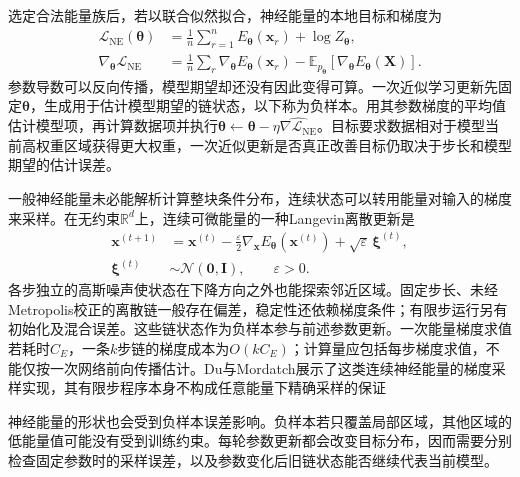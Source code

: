 选定合法能量族后，若以联合似然拟合，神经能量的本地目标和梯度为
\begin{equation}
  \begin{aligned}
    \mathcal{L}_{\mathrm{NE}}(\bm{\theta})
      &=\frac1n\sum_{r=1}^n E_{\bm{\theta}}(\bm{x}_r)
                      +\log Z_{\bm{\theta}},\\
    \nabla_{\bm{\theta}}\mathcal{L}_{\mathrm{NE}}
      &=\frac1n\sum_r\nabla_{\bm{\theta}}E_{\bm{\theta}}(\bm{x}_r)
        -\mathbb{E}_{p_{\bm{\theta}}}
               [\nabla_{\bm{\theta}}E_{\bm{\theta}}(\bm{X})].
  \end{aligned}
  \label{eq:pgm-energy-models-neural-nll}
\end{equation}
参数导数可以反向传播，模型期望却还没有因此变得可算。一次近似学习更新先固定$\bm{\theta}$，生成用于估计模型期望的链状态，以下称为负样本。用其参数梯度的平均值估计模型项，再计算数据项并执行$\bm{\theta}\leftarrow\bm{\theta}-\eta\widehat{\nabla\mathcal{L}_{\mathrm{NE}}}$。目标要求数据相对于模型当前高权重区域获得更大权重，一次近似更新是否真正改善目标仍取决于步长和模型期望的估计误差。

一般神经能量未必能解析计算整块条件分布，连续状态可以转用能量对输入的梯度来采样。在无约束$\mathbb{R}^d$上，连续可微能量的一种Langevin离散更新是
\begin{equation}
  \begin{aligned}
    \bm{x}^{(t+1)}
      &=\bm{x}^{(t)}
        -\frac{\varepsilon}{2}
          \nabla_{\bm{x}}E_{\bm{\theta}}(\bm{x}^{(t)})
        +\sqrt{\varepsilon}\,\bm{\xi}^{(t)},\\
    \bm{\xi}^{(t)}&\sim\mathcal{N}(\bm{0},\bm{I}),
       \qquad \varepsilon>0.
  \end{aligned}
  \label{eq:pgm-energy-models-langevin}
\end{equation}
各步独立的高斯噪声使状态在下降方向之外也能探索邻近区域。固定步长、未经Metropolis校正的离散链一般存在偏差，稳定性还依赖梯度条件；有限步运行另有初始化及混合误差。这些链状态作为负样本参与前述参数更新。一次能量梯度求值若耗时$C_E$，一条$k$步链的梯度成本为$O(kC_E)$；计算量应包括每步梯度求值，不能仅按一次网络前向传播估计。Du与Mordatch展示了这类连续神经能量的梯度采样实现，其有限步程序本身不构成任意能量下精确采样的保证

神经能量的形状也会受到负样本误差影响。负样本若只覆盖局部区域，其他区域的低能量值可能没有受到训练约束。每轮参数更新都会改变目标分布，因而需要分别检查固定参数时的采样误差，以及参数变化后旧链状态能否继续代表当前模型。

